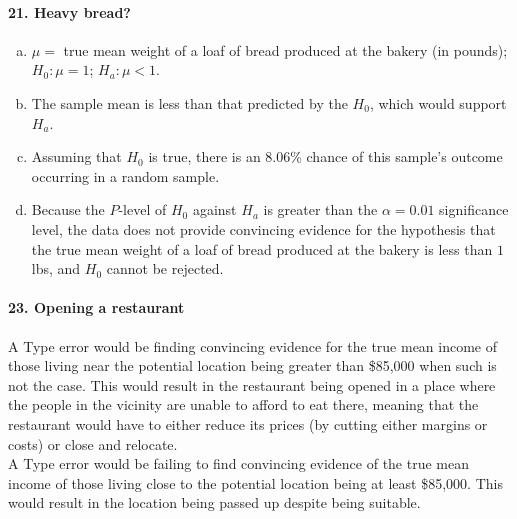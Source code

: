		\paragraph{21. Heavy bread?}
			\begin{enumerate}[a.]
				\item 
					$\mu = $ true mean weight of a loaf of bread produced at the bakery (in pounds); $H_0:\mu = 1$; $H_a:\mu < 1$.
				\item
					The sample mean is less than that predicted by the $H_0$, which would support $H_a$.
				\item
					Assuming that $H_0$ is true, there is an 8.06\% chance of this sample's outcome occurring in a random sample.
				\item
					Because the $P$-level of $H_0$ against $H_a$ is greater than the $\alpha = 0.01$ significance level, the data does not provide convincing evidence for the hypothesis that the true mean weight of a loaf of bread produced at the bakery is less than $1\,$lbs, and $H_0$ cannot be rejected.
			\end{enumerate}
		\paragraph{23. Opening a restaurant}
			A Type  error would be finding convincing evidence for the true mean income of those living near the potential location being greater than \$85,000 when such is not the case. This would result in the restaurant being opened in a place where the people in the vicinity are unable to afford to eat there, meaning that the restaurant would have to either reduce its prices (by cutting either margins or costs) or close and relocate. \\
			A Type  error would be failing to find convincing evidence of the true mean income of those living close to the potential location being at least \$85,000. This would result in the location being passed up despite being suitable.
